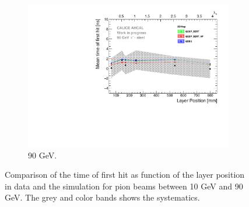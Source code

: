 \begin{figure}[htbp!]
\begin{subfigure}[t]{0.49\textwidth}
    \includegraphics[width=1\textwidth]{../Thesis_Plots/Timing/Pions/Plots/ComparisonToSim/Time_Depth_90GeV_DD4hep.pdf}
    \caption{90 GeV.} \label{fig:Depth_SimData_90GeV_DD4hep}
  \end{subfigure}
  \caption{Comparison of the time of first hit as function of the layer position in data and the \ddhep simulation for pion beams between 10 GeV and 90 GeV. The grey and color bands shows the systematics.}
\end{figure}



